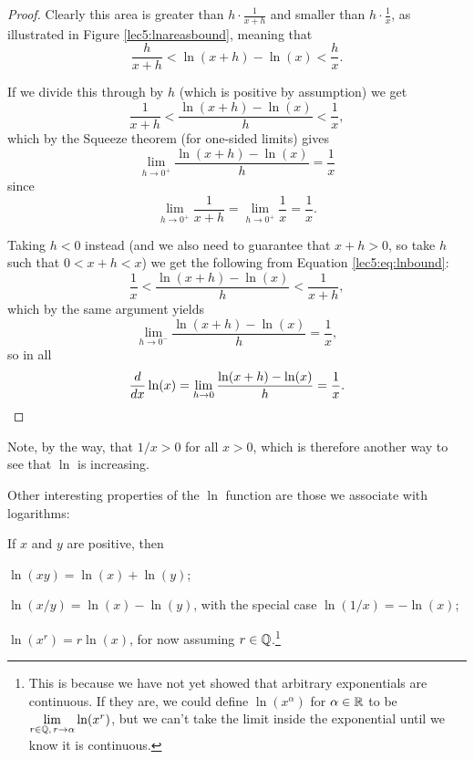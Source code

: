 \begin{proof}
	Clearly this area is greater than $h \cdot \frac{1}{x + h}$ and smaller than $h \cdot \frac{1}{x}$, as illustrated in Figure \ref{lec5:lnareasbound}, meaning that
	\begin{equation}\label{lec5:eq:lnbound}
		\frac{h}{x + h} < \ln(x + h) - \ln(x) < \frac{h}{x}.
	\end{equation}

	\noindent
	If we divide this through by $h$ (which is positive by assumption) we get
	\[
		\frac{1}{x + h} < \frac{\ln(x + h) - \ln(x)}{h} < \frac{1}{x},
	\]
	which by the Squeeze theorem (for one-sided limits) gives
	\[
		\lim_{h \to 0^+} \frac{\ln(x + h) - \ln(x)}{h} = \frac{1}{x}
	\]
	since
	\[
		\lim_{h \to 0^+} \frac{1}{x + h} = \lim_{h \to 0^+} \frac{1}{x} = \frac{1}{x}.
	\]

	\noindent
	Taking $h < 0$ instead (and we also need to guarantee that $x + h > 0$, so take $h$ such that $0 < x + h < x$) we get the following from Equation \eqref{lec5:eq:lnbound}:
	\[
		\frac{1}{x} < \frac{\ln(x + h) - \ln(x)}{h} < \frac{1}{x + h},
	\]
	which by the same argument yields
	\[
		\lim_{h \to 0^-} \frac{\ln(x + h) - \ln(x)}{h} = \frac{1}{x},
	\]
	so in all
	\[
		\frac{d}{d x} \ln(x) = \lim_{h \to 0} \frac{\ln(x + h) - \ln(x)}{h} = \frac{1}{x}. \qedhere
	\]
\end{proof}

\noindent
Note, by the way, that $1 / x > 0$ for all $x > 0$, which is therefore another way to see that $\ln$ is increasing.

Other interesting properties of the $\ln$ function are those we associate with logarithms:

\begin{theorem}
	If $x$ and $y$ are positive, then
	\begin{romanlist}
		\item $\ln(x y) = \ln(x) + \ln(y)$;
		\item $\ln(x / y) = \ln(x) - \ln(y)$, with the special case $\ln(1 / x) = - \ln(x)$;
		\item $\ln(x^r) = r \ln(x)$, for now assuming $r \in \mathbb{Q}$.\footnote{This is because we have not yet showed that arbitrary exponentials are continuous.
		If they are, we could define $\ln(x^\alpha)$ for $\alpha \in \mathbb{R}$ to be $\lim\limits_{r \in \mathbb{Q},\, r \to \alpha} \ln(x^r)$, but we can't take the limit inside the exponential until we know it is continuous.}
	\end{romanlist}
\end{theorem}

